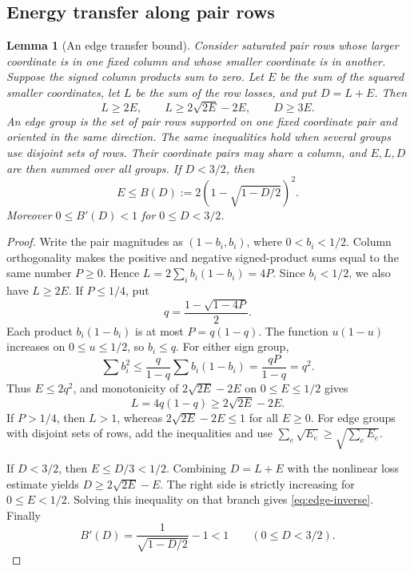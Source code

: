\documentclass[11pt]{article}
\numberwithin{equation}{section}
\newtheorem{lemma}[lemma]{Lemma}
\theoremstyle{definition}
\theoremstyle{definition}
\begin{document}
\subsection{Energy transfer along pair rows}

\begin{lemma}[An edge transfer bound]\label{lem:edge-transfer}
Consider saturated pair rows whose larger coordinate is in one fixed
column and whose smaller coordinate is in another. Suppose
the signed column products sum to zero. Let $E$ be the sum
of the squared smaller coordinates, let $L$ be the sum of
the row losses, and put $D=L+E$. Then
\begin{equation}
 L\ge2E,
 \qquad L\ge2\sqrt{2E}-2E,
 \qquad D\ge3E.
 \label{eq:edge-loss}
\end{equation}
An \emph{edge group} is the set of pair rows supported on one fixed
coordinate pair and oriented in the same direction. The same
inequalities hold when several groups use disjoint sets of rows.
Their coordinate pairs may share a column, and $E,L,D$ are then
summed over all groups. If $D<3/2$, then
\begin{equation}
 E\le B(D):=2\left(1-\sqrt{1-D/2}\right)^2.
 \label{eq:edge-inverse}
\end{equation}
Moreover $0\le B'(D)<1$ for $0\le D<3/2$.
\end{lemma}

\begin{proof}
Write the pair magnitudes as $(1-b_i,b_i)$, where
$0<b_i<1/2$. Column orthogonality makes the positive and negative signed-product
sums equal to the same number $P\ge0$.  Hence
$L=2\sum_i b_i(1-b_i)=4P$.  Since $b_i<1/2$,
we also have $L\ge2E$.  If $P\le1/4$, put
\[
 q=\frac{1-\sqrt{1-4P}}2.
\]
Each product $b_i(1-b_i)$ is at most $P=q(1-q)$.
The function $u(1-u)$ increases on $0\le u\le1/2$, so
$b_i\le q$.  For either sign group,
\[
 \sum b_i^2
 \le\frac{q}{1-q}\sum b_i(1-b_i)
 =\frac{qP}{1-q}=q^2.
\]
Thus $E\le2q^2$, and monotonicity of
$2\sqrt{2E}-2E$ on $0\le E\le1/2$ gives
\[
 L=4q(1-q)\ge2\sqrt{2E}-2E.
\]
If $P>1/4$, then $L>1$, whereas
$2\sqrt{2E}-2E\le1$ for all $E\ge0$.
For edge groups with disjoint sets of rows, add the inequalities
and use $\sum_e\sqrt{E_e}\ge\sqrt{\sum_eE_e}$.

If $D<3/2$, then $E\le D/3<1/2$.  Combining $D=L+E$
with the nonlinear loss estimate yields
$D\ge2\sqrt{2E}-E$.  The right side is strictly increasing for
$0\le E<1/2$.  Solving this inequality on that branch gives
\eqref{eq:edge-inverse}.
Finally
\[
 B'(D)=\frac1{\sqrt{1-D/2}}-1<1
 \qquad(0\le D<3/2).
\]
\end{proof}
\end{document}

